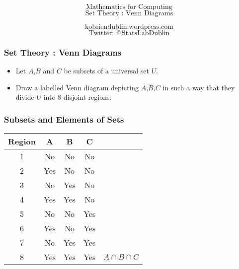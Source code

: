 \documentclass{beamer}
\begin{document}
\begin{frame}
\Huge
\[ \mbox{Mathematics for Computing} \]
\huge
\[ \mbox{Set Theory : Venn Diagrams} \]

\Large
\[ \mbox{kobriendublin.wordpress.com} \]
\[ \mbox{Twitter: @StatsLabDublin} \]

\end{frame}

\begin{frame}
\frametitle{Set Theory : Venn Diagrams}
\Large
\vspace{-0.5cm}
\begin{itemize}
\item Let $A$,$B$ and $C$ be subsets of a universal set $U$.
\item Draw a labelled Venn diagram depicting $A$,$B$,$C$ in such a way that they divide $U$ into 8 disjoint regions.
\end{itemize}

\end{frame}
\begin{frame}
\frametitle{Subsets and Elements of Sets}
\Large
\vspace{-1cm}
\begin{center}
\begin{tabular}{|c|c|c|c|c|}
\hline Region & A & B & C &  \\ 
\hline 1 &\phantom{sp} No \phantom{sp}&\phantom{sp} No\phantom{sp} & \phantom{sp} No \phantom{sp} &  \\ 
\hline 2 & Yes & No & No &  \\ 
\hline 3 & No & Yes & No &  \\ 
\hline 4 & Yes & Yes & No &  \\ 
\hline 5 & No & No & Yes &  \\ 
\hline 6 & Yes & No & Yes &  \\ 
\hline 7 & No & Yes & Yes &  \\ 
\hline 8 & Yes & Yes & Yes & $A \cap B \cap C$ \\ 
\hline 
\end{tabular}
\end{center} 
\end{frame}
\end{document}
